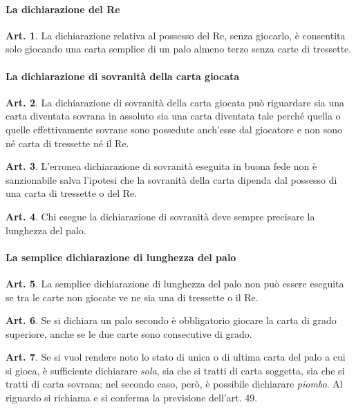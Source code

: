 \documentclass[italian,a4paper]{article}
\theoremstyle{definition}
\newtheorem{art}{Art.}
\begin{document}
\paragraph{La dichiarazione del Re}
\begin{art}
    La dichiarazione relativa al possesso del Re, senza giocarlo, è consentita solo giocando una carta semplice di un palo almeno terzo senza carte di tressette.
\end{art}
\paragraph{La dichiarazione di sovranità della carta giocata}
\begin{art}
    La dichiarazione di sovranità della carta giocata può riguardare sia una carta diventata sovrana in assoluto sia una carta diventata tale perché quella o quelle effettivamente sovrane sono possedute anch'esse dal giocatore e non sono né carta di tressette né il Re.
\end{art}
\begin{art}
    L'erronea dichiarazione di sovranità eseguita in buona fede non è sanzionabile salva l'ipotesi che la sovranità della carta dipenda dal possesso di una carta di tressette o del Re.
\end{art}
\begin{art}
    Chi esegue la dichiarazione di sovranità deve sempre precisare la lunghezza del palo.
\end{art}
\paragraph{La semplice dichiarazione di lunghezza del palo}
\begin{art}
    La semplice dichiarazione di lunghezza del palo non può essere eseguita se tra le carte non giocate ve ne sia una di tressette o il Re.
\end{art}
\begin{art}
    Se si dichiara un palo secondo è obbligatorio giocare la carta di grado superiore, anche se le due carte sono consecutive di grado.
\end{art}
\begin{art}
    Se si vuol rendere noto lo stato di unica o di ultima carta del palo a cui si gioca,  è sufficiente dichiarare \emph{sola}, sia che si tratti di carta soggetta, sia che si tratti di carta sovrana; nel secondo caso, però, è possibile dichiarare \emph{piombo}.
    Al riguardo si richiama e si conferma la previsione dell'art. 49.
\end{art}
\end{document}
